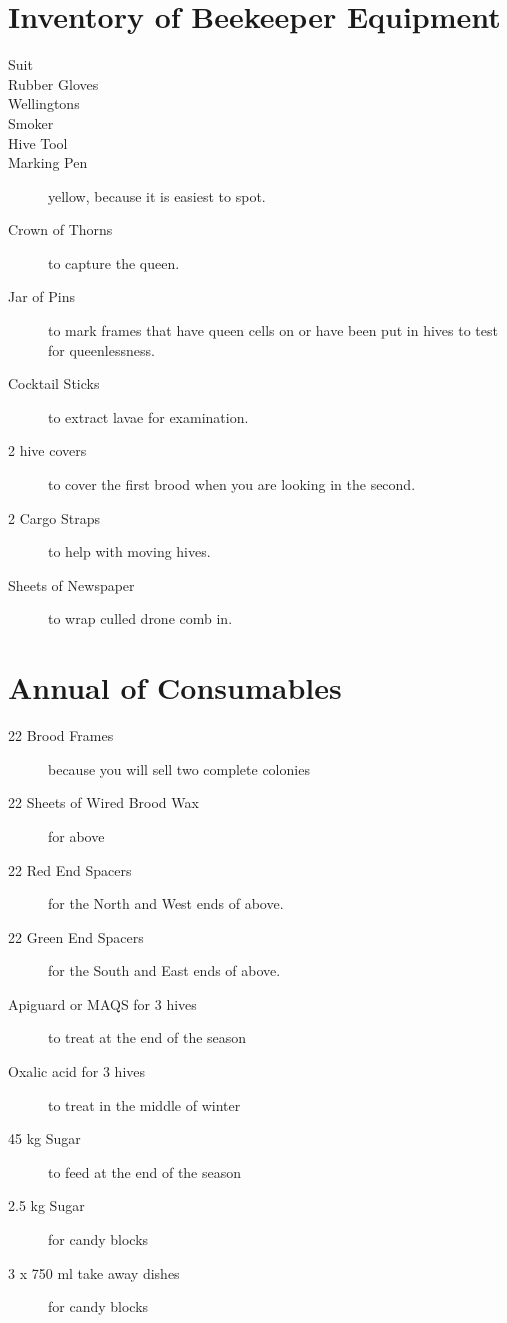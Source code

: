 \documentclass{./BeekeepingBook}
\begin{document}
\section{Inventory of Beekeeper Equipment}

\begin{description}
  \item[Suit]  
  \item[Rubber Gloves] 
  \item[Wellingtons] 
  \item[Smoker] 
  \item[Hive Tool] 
  \item[Marking Pen] yellow, because it is easiest to spot.
  \item[Crown of Thorns]  to capture the queen.
  \item[Jar of Pins]  to mark frames that have queen cells on or have been put in hives to test for queenlessness.
  \item[Cocktail Sticks]  to extract lavae for examination.
  \item[2 hive covers] to cover the first brood when you are looking in the second.
  \item[2 Cargo Straps] to help with moving hives. 
  \item[Sheets of Newspaper] to wrap culled drone comb in.
\end{description}

\section{Annual of Consumables}

\begin{description}
  \item[22 Brood Frames] because you will sell two complete colonies
  \item[22 Sheets of Wired Brood Wax] for above 
  \item[22 Red End Spacers] for the North and West ends of above.
  \item[22 Green End Spacers] for the South and East ends of above.
  \item[Apiguard or MAQS for 3 hives] to treat at the end of the season
  \item[Oxalic acid for 3 hives] to treat in the middle of winter
  \item[45 kg Sugar] to feed at the end of the season
  \item[2.5 kg Sugar] for candy blocks
  \item[3 x 750 ml take away dishes] for candy blocks
\end{description}
\end{document}
